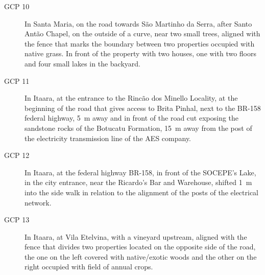 \begin{description}
\item[GCP 10]
In Santa Maria, on the road towards São Martinho da Serra, after Santo Antão Chapel, on the outside of a 
curve, near two small trees, aligned with the fence that marks the boundary between two properties occupied 
with native grass. In front of the property with two houses, one with two floors and four small lakes in the 
backyard.
 
\item[GCP 11]
In Itaara, at the entrance to the Rincão dos Minello Locality, at the beginning of the road that gives access 
to Brita Pinhal, next to the BR-158 federal highway, \SI{5}{\m} away and in front of the road cut exposing the 
sandstone rocks of the Botucatu Formation, \SI{15}{\m} away from the post of the electricity transmission line 
of the AES company.

\item[GCP 12]
In Itaara, at the federal highway BR-158, in front of the SOCEPE's Lake, in the city entrance, near the 
Ricardo's Bar and Warehouse, shifted \SI{1}{\m} into the side walk in relation to the alignment of the posts 
of the electrical network.

\item[GCP 13]
In Itaara, at Vila Etelvina, with a vineyard upstream, aligned with the fence that divides two properties 
located on the opposite side of the road, the one on the left covered with native/exotic woods and the other 
on the right occupied with field of annual crops.
 

\end{description}
